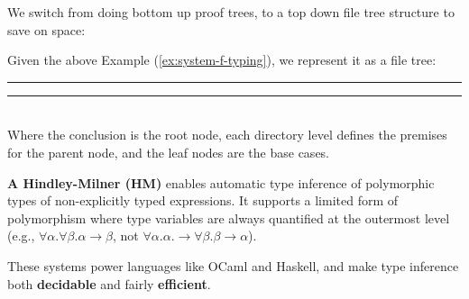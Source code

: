 \noindent
\DTsetlength{.2em}{1.5em}{.2em}{0.4pt}{0pt}

\noindent
We switch from doing bottom up proof trees, to a top down file tree structure to save on space:
\begin{Def}

    Given the above Example (\ref{ex:system-f-typing}), we represent it as a file tree:

    \noindent
    \rule{\textwidth}{0.4pt}
    \vspace{1em}
    \LARGE
    \normalsize

    \vspace{1em}
    \noindent
    \rule{\textwidth}{0.4pt}\\


    \noindent
    Where the conclusion is the root node, each directory level defines the premises 
    for the parent node, and the leaf nodes are the base cases.
\end{Def}
    
\noindent

\begin{Def}

    \textbf{A Hindley-Milner (HM)} enables automatic type inference of polymorphic types of non-explicitly typed expressions.
    It supports a limited form of polymorphism where type variables are always quantified at the outermost level (e.g., $\forall \alpha.\forall \beta.\alpha \to \beta$, not $\forall \alpha.\alpha.\to \forall \beta.\beta\to\alpha$).
    
    These systems power languages like OCaml and Haskell, and make type inference both \textbf{decidable} and fairly \textbf{efficient}.
    \end{Def}

